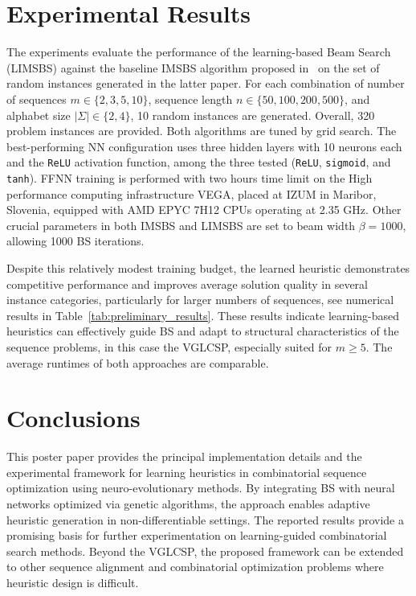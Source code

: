 \documentclass{sigplanconf}
\begin{document}
	\section{Experimental Results}
	

	The experiments evaluate the performance of the learning-based Beam Search (LIMSBS) against the baseline IMSBS algorithm proposed in~\cite{djukanovic_eurocast_2026} on the set of random instances generated in the latter paper. For each combination of number of sequences $m \in \{2,3,5,10\}$, sequence length $n \in \{50,100,200,500\}$, and alphabet size $|\Sigma| \in \{2,4\}$, 10 random instances are generated.  Overall, 320 problem instances are provided. Both algorithms are tuned by grid search. The best-performing NN configuration uses three hidden layers with 10 neurons each and the \texttt{ReLU} activation function, among the three tested (\texttt{ReLU}, \texttt{sigmoid}, and \texttt{tanh}).	FFNN training is performed with two hours time limit on the High performance computing infrastructure VEGA, placed at IZUM in Maribor, Slovenia, equipped with AMD EPYC 7H12 CPUs operating
	at 2.35 GHz.   Other crucial parameters in both  IMSBS and LIMSBS are set to beam width $\beta=1000$, allowing 1000 BS iterations.
	
	Despite this relatively modest training budget, the learned heuristic demonstrates competitive performance and improves average solution quality in several instance categories, particularly for larger numbers of sequences, see numerical results in Table~\ref{tab:preliminary_results}.  These results indicate learning-based heuristics can effectively guide BS and adapt to structural characteristics of the sequence  problems, in this case the VGLCSP, especially suited for $m\geq 5$. The average runtimes of both approaches are comparable.
	
	
	
	\section{Conclusions}
	
	This poster paper provides the principal implementation details and the experimental framework for learning heuristics in combinatorial sequence optimization using neuro-evolutionary methods. 
	By integrating BS with neural networks optimized via genetic algorithms, the approach enables adaptive heuristic generation in non-differentiable settings. The   reported results provide a promising basis for further experimentation on learning-guided combinatorial search methods. 
	Beyond the VGLCSP, the proposed framework can be extended to other sequence alignment and combinatorial optimization problems where heuristic design is difficult.
	
\end{document}
